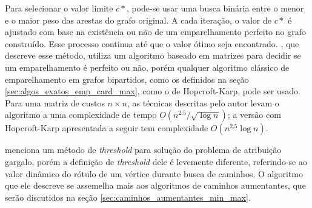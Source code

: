 Para selecionar o valor limite $c\ast$, pode-se usar uma busca binária entre o menor e o maior peso das arestas do grafo original. A cada iteração, o valor de $c\ast$ é ajustado com base na existência ou não de um emparelhamento perfeito no grafo construído. Esse processo continua até que o valor ótimo seja encontrado. , que descreve esse método, utiliza um algoritmo baseado em matrizes para decidir se um emparelhamento é perfeito ou não, porém qualquer algoritmo clássico de emparelhamento em grafos bipartidos, como os definidos na seção \ref{sec:algos_exatos_emp_card_max}, como o de Hopcroft-Karp, pode ser usado. Para uma matriz de custos $n \times n$, as técnicas descritas pelo autor levam o algoritmo a uma complexidade de tempo $O(n^{2.5} / \sqrt{\log n})$; a versão com Hopcroft-Karp apresentada a seguir tem complexidade $O(n^{2.5} \log n)$.

 menciona um método de \textit{threshold} para solução do problema de atribuição gargalo, porém a definição de \textit{threshold} dele é levemente diferente, referindo-se ao valor dinâmico do rótulo de um vértice durante busca de caminhos. O algoritmo que ele descreve se assemelha mais aos algoritmos de caminhos aumentantes, que serão discutidos na seção \ref{sec:caminhos_aumentantes_min_max}.

